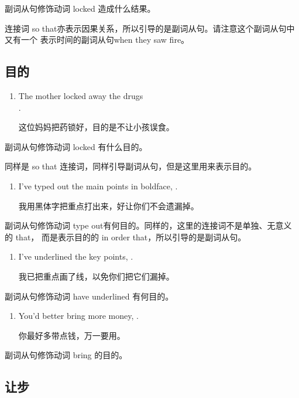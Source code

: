 副词从句修饰动词 locked 造成什么结果。

连接词 so that亦表示因果关系，所以引导的是副词从句。请注意这个副词从句中又有一个
表示时间的副词从句when they saw fire。

\subsection{目的}

\begin{enumerate}
\item The mother locked away the drugs  \\
  .

  这位妈妈把药锁好，目的是不让小孩误食。
\end{enumerate}
副词从句修饰动词 locked 有什么目的。

同样是 so that 连接词，同样引导副词从句，但是这里用来表示目的。

\begin{enumerate}[resume]
\item I've typed out the main points in boldface, 
  .

  我用黑体字把重点打出来，好让你们不会遗漏掉。
\end{enumerate}
副词从句修饰动词 type out有何目的。同样的，这里的连接词不是单独、无意义的 that，
而是表示目的的 in order that，所以引导的是副词从句。

\begin{enumerate}[resume]
\item I've underlined the key points,  .

  我已把重点画了线，以免你们把它们漏掉。
\end{enumerate}
副词从句修饰动词 have underlined 有何目的。

\begin{enumerate}[resume]
\item You'd better bring more money,  .

  你最好多带点钱，万一要用。
\end{enumerate}
副词从句修饰动词 bring 的目的。

\subsection{让步}

